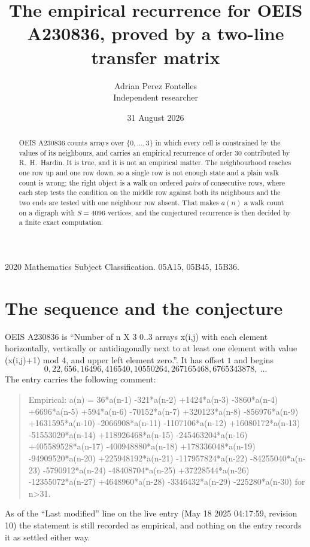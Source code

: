 \documentclass[11pt,a4paper]{article}
\title{The empirical recurrence for OEIS A230836, proved by a two-line transfer matrix}
\author{Adrian Perez Fontelles\\ \small Independent researcher}
\date{31 August 2026}
\theoremstyle{plain}
\theoremstyle{definition}
\begin{document}
\maketitle

\begin{abstract}
OEIS A230836 counts arrays over $\{0,\dots,3\}$ in which every cell is constrained by the
values of its neighbours, and carries an empirical recurrence of order $30$ contributed
by R.~H.~Hardin. It is true, and it is not an empirical matter. The neighbourhood reaches one
row up and one row down, so a single row is not enough state and a plain walk count
is wrong; the right object is a walk on ordered \emph{pairs} of consecutive rows, where
each step tests the condition on the middle row against both its neighbours and the two
ends are tested with one neighbour row absent. That makes $a(n)$ a walk count on a digraph
with $S=4096$ vertices, and the conjectured recurrence is then decided by a finite exact
computation.
\end{abstract}

\noindent\small 2020 Mathematics Subject Classification. 05A15, 05B45, 15B36.\normalsize

\section{The sequence and the conjecture}

OEIS A230836 is ``Number of n X 3 0..3 arrays x(i,j) with each element horizontally, vertically or antidiagonally next to at least one element with value (x(i,j)+1) mod 4, and upper left element zero.''. It has offset $1$ and begins
\[
0, 22, 656, 16496, 416540, 10550264, 267165468, 6765343878,\ \dots
\]
The entry carries the following comment:
\begin{quote}\small
Empirical: a(n) = 36*a(n-1) -321*a(n-2) +1424*a(n-3) -3860*a(n-4) +6696*a(n-5) +594*a(n-6) -70152*a(n-7) +320123*a(n-8) -856976*a(n-9) +1631595*a(n-10) -2066908*a(n-11) -1107106*a(n-12) +16080172*a(n-13) -51553020*a(n-14) +118926468*a(n-15) -245463204*a(n-16) +405589528*a(n-17) -400948880*a(n-18) +178336048*a(n-19) -94909520*a(n-20) +225948192*a(n-21) -117957824*a(n-22) -84255040*a(n-23) -5790912*a(n-24) -48408704*a(n-25) +37228544*a(n-26) -12355072*a(n-27) +4648960*a(n-28) -3346432*a(n-29) -225280*a(n-30) for n>31.
\end{quote}
As of the ``Last modified'' line on the live entry (May 18 2025 04:17:59, revision 10) the statement is
still recorded as empirical, and nothing on the entry records it as settled either way.
\end{document}
